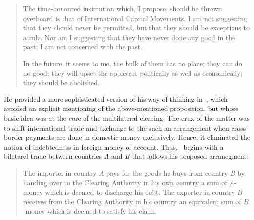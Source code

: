 \begin{quote}
The time-honoured institution which, I propose, should be thrown overboard is that of International Capital Movements. I am not suggesting that they should never be permitted, but that they should be exceptions to a rule. Nor am I suggesting that they have never done any good in the past; I am not concerned with the past.\par In the future, it seems to me, the bulk of them has no place; they can do no good; they will upset the applecart politically as well as economically; they should be abolished.~\cite[p.~2]{schumacher1939}
\end{quote}

He provided a more sophisticated version of his way of thinking in~\cite{schumacher1943}, which avoided an explicit mentioning of the above-mentioned proposition, but whose basic idea was at the core of the multilateral clearing. The crux of the matter was to shift international trade and exchange to the such an arrangement when cross-border payments are done in domestic money exclusively. Hence, it eliminated the notion of indebtedness in foreign money of account. Thus,~\cite{schumacher1943} begins with a biletarel trade between countries $A$ and $B$ that follows his proposed arranegment:

\begin{quote}
The importer in country $A$ pays for the goods he buys from country $B$ by handing over to the Clearing Authority in his own country a sum of $A$-money which is deemed to discharge his debt. The exporter in country $B$ receives from the Clearing Authority in his country an equivalent sum of $B$-money which is deemed to satisfy his claim.~\cite[p.~150]{schumacher1943}
\end{quote}

